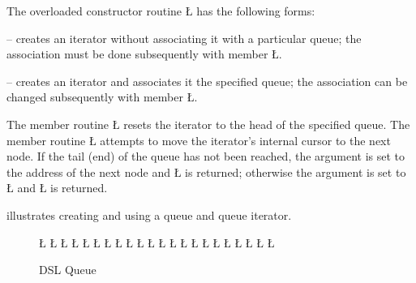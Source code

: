 \documentclass[openright,twoside]{report}
\begin{document}
The overloaded constructor routine \LGinlinetrue\LGbegin\lgrinde\L{}\endlgrinde\LGend{} has the following forms:
\begin{prefix}
\item[\LGinlinetrue\LGbegin\lgrinde\L{\LB{\V{uQueueIter}()}}\endlgrinde\LGend{}]
-- creates an iterator without associating it with a particular queue;
the association must be done subsequently with member \LGinlinetrue\LGbegin\lgrinde\L{}\endlgrinde\LGend{}.

\item[\LGinlinetrue\LGbegin\lgrinde\L{\LB{\V{uQueueIter}(\0\K{const}\0\V{uQueue}\<\V{T}\>\0\&\0\V{q}\0)}}\endlgrinde\LGend{}]
-- creates an iterator and associates it the specified queue;
the association can be changed subsequently with member \LGinlinetrue\LGbegin\lgrinde\L{}\endlgrinde\LGend{}.
\end{prefix}

The member routine \LGinlinetrue\LGbegin\lgrinde\L{}\endlgrinde\LGend{} resets the iterator to the head of the specified queue.
The member routine \LGinlinetrue\LGbegin\lgrinde\L{\LB{\>\>}}\endlgrinde\LGend{} attempts to move the iterator's internal cursor to the next node.
If the tail (end) of the queue has not been reached, the argument is set to the address of the next node and \LGinlinetrue\LGbegin\lgrinde\L{}\endlgrinde\LGend{} is returned;
otherwise the argument is set to \LGinlinetrue\LGbegin\lgrinde\L{}\endlgrinde\LGend{} and \LGinlinetrue\LGbegin\lgrinde\L{}\endlgrinde\LGend{} is returned.

 illustrates creating and using a queue and queue iterator.

\begin{figure}
\LGinlinefalse\LGbegin\lgrinde
\L{}
\L{\LB{}}
\L{\LB{}}
\L{\LB{\};}}
\L{}
\L{\LB{}}
\L{\LB{}}
\L{\LB{}}
\L{\LB{}}
\L{\LB{}}
\L{\LB{}}
\CE{}\L{\LB{}}
\L{\LB{}}
\L{\LB{}}
\CE{}\L{\LB{}}
\L{\LB{}}
\L{\LB{}}
\L{\LB{}}
\CE{}\L{\LB{}}
\L{\LB{}}
\L{\LB{}}
\L{\LB{\}}}
\endlgrinde\LGend
\caption{DSL Queue}
\label{f:DSLQueue}
\end{figure}
\end{document}

